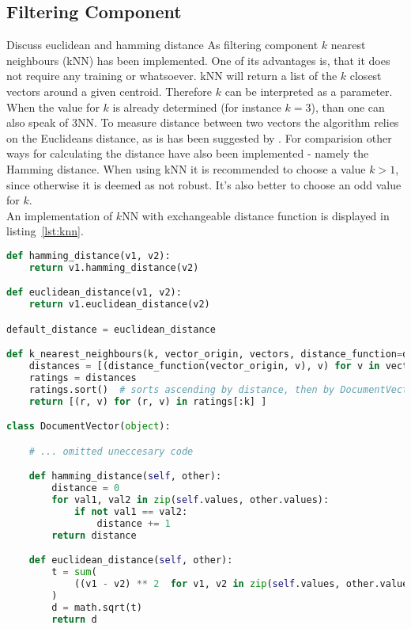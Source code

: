 
\subsection{Filtering Component}
\label{sec:filtering-component}
{\color{red}\tiny Discuss euclidean and hamming distance}
As filtering component $k$ nearest neighbours (kNN) has been implemented.
One of its advantages is, that it does not require any training or whatsoever.\citep[p.~290]{manning:2009}
kNN will return a list of the $k$ closest vectors around a given centroid.
Therefore $k$ can be interpreted as a parameter.
When the value for $k$ is already determined (for instance $k=3$), than one can also speak of 3NN.\citep[p.~297-298]{manning:2009}
To measure distance between two vectors the algorithm relies on the Euclideans distance, as is has been suggested by \citeauthor{manning:2009}.\citep[p.~292]{manning:2009}
For comparision other ways for calculating the distance have also been implemented - namely the Hamming distance.
When using kNN it is recommended to choose a value $k > 1$, since otherwise it is deemed as not robust.
It's also better to choose an odd value for $k$.\\
An implementation of $k$NN with exchangeable distance function is displayed in listing~\ref{lst:knn}.

\begin{lstlisting}[language=Python,caption={kNN and distance methods},label={lst:knn},float=h]
def hamming_distance(v1, v2):
    return v1.hamming_distance(v2)

def euclidean_distance(v1, v2):
    return v1.euclidean_distance(v2)

default_distance = euclidean_distance

def k_nearest_neighbours(k, vector_origin, vectors, distance_function=default_distance):
    distances = [(distance_function(vector_origin, v), v) for v in vectors]
    ratings = distances
    ratings.sort()  # sorts ascending by distance, then by DocumentVector
    return [(r, v) for (r, v) in ratings[:k] ]

class DocumentVector(object):

    # ... omitted uneccesary code

    def hamming_distance(self, other):
        distance = 0
        for val1, val2 in zip(self.values, other.values):
            if not val1 == val2:
                distance += 1
        return distance

    def euclidean_distance(self, other):
        t = sum(
            ((v1 - v2) ** 2  for v1, v2 in zip(self.values, other.values))
        )
        d = math.sqrt(t)
        return d
\end{lstlisting}


